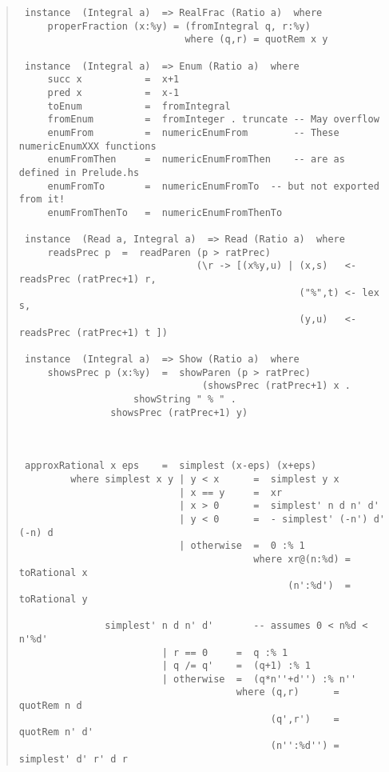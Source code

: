 \begin{quote}
{\begin{verbatim}
 instance  (Integral a)  => RealFrac (Ratio a)  where
     properFraction (x:%y) = (fromIntegral q, r:%y)
                             where (q,r) = quotRem x y
 
 instance  (Integral a)  => Enum (Ratio a)  where
     succ x           =  x+1
     pred x           =  x-1
     toEnum           =  fromIntegral
     fromEnum         =  fromInteger . truncate	-- May overflow
     enumFrom         =  numericEnumFrom		-- These numericEnumXXX functions
     enumFromThen     =  numericEnumFromThen	-- are as defined in Prelude.hs
     enumFromTo       =  numericEnumFromTo	-- but not exported from it!
     enumFromThenTo   =  numericEnumFromThenTo
 
 instance  (Read a, Integral a)  => Read (Ratio a)  where
     readsPrec p  =  readParen (p > ratPrec)
                               (\r -> [(x%y,u) | (x,s)   <- readsPrec (ratPrec+1) r,
                                                 ("%",t) <- lex s,
                                                 (y,u)   <- readsPrec (ratPrec+1) t ])
 
 instance  (Integral a)  => Show (Ratio a)  where
     showsPrec p (x:%y)  =  showParen (p > ratPrec)
                                (showsPrec (ratPrec+1) x . 
 			        showString " % " . 
 				showsPrec (ratPrec+1) y)
 
 
 
 approxRational x eps    =  simplest (x-eps) (x+eps)
         where simplest x y | y < x      =  simplest y x
                            | x == y     =  xr
                            | x > 0      =  simplest' n d n' d'
                            | y < 0      =  - simplest' (-n') d' (-n) d
                            | otherwise  =  0 :% 1
                                         where xr@(n:%d) = toRational x
                                               (n':%d')  = toRational y
 
               simplest' n d n' d'       -- assumes 0 < n%d < n'%d'
                         | r == 0     =  q :% 1
                         | q /= q'    =  (q+1) :% 1
                         | otherwise  =  (q*n''+d'') :% n''
                                      where (q,r)      =  quotRem n d
                                            (q',r')    =  quotRem n' d'
                                            (n'':%d'') =  simplest' d' r' d r
\end{verbatim}}
\end{quote}
